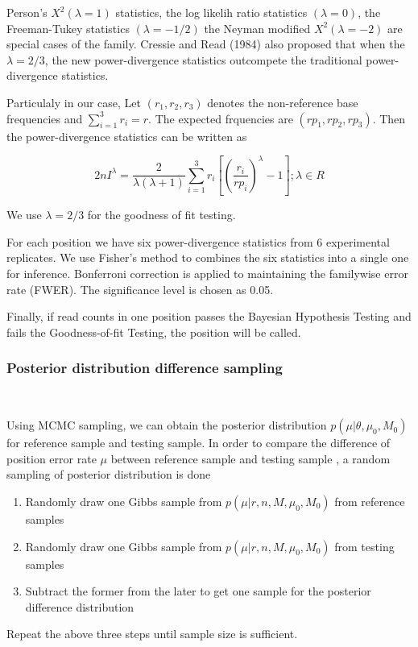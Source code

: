 \documentclass[11pt,reqno]{amsart}
\begin{document}
Person's $X^2 (\lambda = 1)$ statistics, the log likelih ratio statistics $(\lambda = 0)$, the Freeman-Tukey statistics $(\lambda = -1/2)$ the Neyman modified $X^2 (\lambda = -2)$ are special cases of the family. Cressie and Read (1984) also proposed that when the $\lambda =2/3$, the new power-divergence statistics outcompete the traditional power-divergence statistics. 

Particulaly in our case, Let $(r_1,r_2,r_3)$ denotes the non-reference base frequencies and $\sum_{i=1}^3 r_i = r$. The expected frquencies are $(rp_1, rp_2, rp_3)$. Then the power-divergence statistics can be written as

\begin{equation}
 2nI^\lambda = \frac{2}{\lambda(\lambda+1)}\sum_{i=1}^3 r_i \left[\left(\frac{r_i}{rp_i}\right)^\lambda-1\right];\lambda \in R
\end{equation}

We use $\lambda =2/3$ for the goodness of fit testing.

For each position we have six power-divergence statistics from 6 experimental replicates. We use Fisher's method to combines the six statistics into a single one for inference. Bonferroni correction is applied to maintaining the familywise error rate (FWER). The significance level is chosen as 0.05.

Finally, if read counts in one position passes the Bayesian Hypothesis Testing and fails the Goodness-of-fit Testing, the position will be called.


\subsubsection{Posterior distribution difference sampling}\

Using MCMC sampling, we can obtain the posterior distribution $p \left( \mu |\theta,\mu_0,M_0\right)$ for reference sample and testing sample. In order to compare the difference of position error rate $\mu$ between reference sample and testing sample , a random sampling of posterior distribution is done 

\begin{enumerate}
 \item Randomly  draw one Gibbs sample from $p \left( \mu |r, n, M, \mu_0, M_0\right)$ from reference samples
 \item Randomly draw one Gibbs sample from $p \left( \mu |r, n, M, \mu_0,M_0\right) $ from testing samples
 \item Subtract the former from the later to get one sample for the posterior difference distribution 
\end{enumerate}
Repeat the above three steps until sample size is sufficient.
\end{document}
